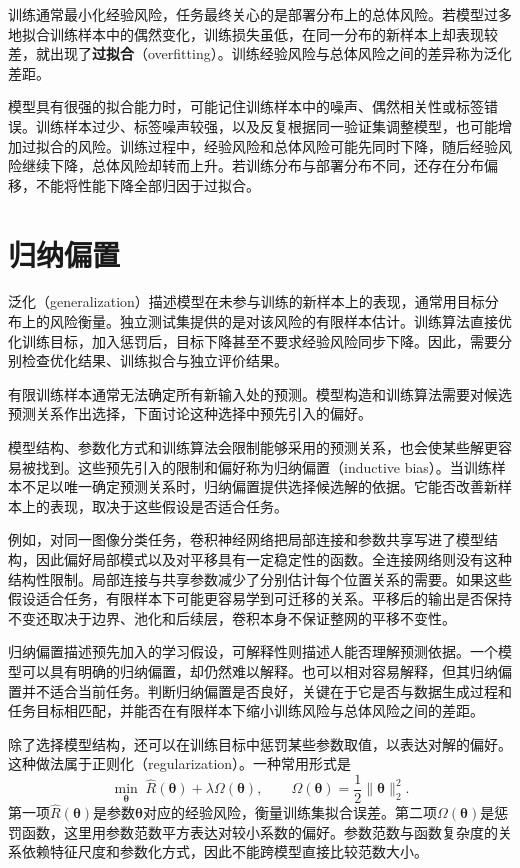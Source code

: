 训练通常最小化经验风险，任务最终关心的是部署分布上的总体风险。若模型过多地拟合训练样本中的偶然变化，训练损失虽低，在同一分布的新样本上却表现较差，就出现了\textbf{过拟合}（overfitting）。训练经验风险与总体风险之间的差异称为泛化差距。

模型具有很强的拟合能力时，可能记住训练样本中的噪声、偶然相关性或标签错误。训练样本过少、标签噪声较强，以及反复根据同一验证集调整模型，也可能增加过拟合的风险。训练过程中，经验风险和总体风险可能先同时下降，随后经验风险继续下降，总体风险却转而上升。若训练分布与部署分布不同，还存在分布偏移，不能将性能下降全部归因于过拟合。


\section{归纳偏置}

泛化（generalization）描述模型在未参与训练的新样本上的表现，通常用目标分布上的风险衡量。独立测试集提供的是对该风险的有限样本估计。训练算法直接优化训练目标，加入惩罚后，目标下降甚至不要求经验风险同步下降。因此，需要分别检查优化结果、训练拟合与独立评价结果。

有限训练样本通常无法确定所有新输入处的预测。模型构造和训练算法需要对候选预测关系作出选择，下面讨论这种选择中预先引入的偏好。

模型结构、参数化方式和训练算法会限制能够采用的预测关系，也会使某些解更容易被找到。这些预先引入的限制和偏好称为归纳偏置（inductive bias）。当训练样本不足以唯一确定预测关系时，归纳偏置提供选择候选解的依据。它能否改善新样本上的表现，取决于这些假设是否适合任务。

例如，对同一图像分类任务，卷积神经网络把局部连接和参数共享写进了模型结构，因此偏好局部模式以及对平移具有一定稳定性的函数。全连接网络则没有这种结构性限制。局部连接与共享参数减少了分别估计每个位置关系的需要。如果这些假设适合任务，有限样本下可能更容易学到可迁移的关系。平移后的输出是否保持不变还取决于边界、池化和后续层，卷积本身不保证整网的平移不变性。

归纳偏置描述预先加入的学习假设，可解释性则描述人能否理解预测依据。一个模型可以具有明确的归纳偏置，却仍然难以解释。也可以相对容易解释，但其归纳偏置并不适合当前任务。判断归纳偏置是否良好，关键在于它是否与数据生成过程和任务目标相匹配，并能否在有限样本下缩小训练风险与总体风险之间的差距。

除了选择模型结构，还可以在训练目标中惩罚某些参数取值，以表达对解的偏好。这种做法属于正则化（regularization）。一种常用形式是
\begin{equation}
 \min_{\bm{\theta}}\;\hat{R}(\bm{\theta})+\lambda\Omega(\bm{\theta}),
 \qquad \Omega(\bm{\theta})=\frac12\|\bm{\theta}\|_2^2.\label{eq:foundations-regularized-risk}
\end{equation}
第一项$\hat R(\bm\theta)$是参数$\bm\theta$对应的经验风险，衡量训练集拟合误差。第二项$\Omega(\bm\theta)$是惩罚函数，这里用参数范数平方表达对较小系数的偏好。参数范数与函数复杂度的关系依赖特征尺度和参数化方式，因此不能跨模型直接比较范数大小。

